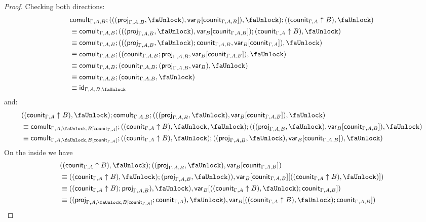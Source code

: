 \documentclass[10pt]{article}
\theoremstyle{definition}
\newcommand{\id}{\mathsf{id}}
\newcommand\proj[1]{\ensuremath{\mathsf{proj}_{#1}}}
\newcommand\qvar[1]{\ensuremath{\mathsf{var}_{#1}}}
\newcommand{\lock}{\text{\faUnlock}}
\newcommand{\counit}[1]{\mathsf{counit}_{#1}}
\newcommand{\comult}[1]{\mathsf{comult}_{#1}}
\begin{document}
\begin{proof}
Checking both directions:
\begin{align*}
&\comult{\Gamma, A, B};(((\proj{\Gamma, A, B}, \lock), \qvar{B}[\counit{\Gamma, A,B}]), \lock);((\counit{\Gamma, A} \uparrow B), \lock) \\
&\equiv \comult{\Gamma, A, B};(((\proj{\Gamma, A, B}, \lock), \qvar{B}[\counit{\Gamma, A,B}]);(\counit{\Gamma, A} \uparrow B), \lock) \\
&\equiv \comult{\Gamma, A, B};(((\proj{\Gamma, A, B}, \lock);\counit{\Gamma, A,B}, \qvar{B}[\counit{\Gamma, A}]), \lock) \\
&\equiv \comult{\Gamma, A, B};((\counit{\Gamma, A, B};\proj{\Gamma, A, B}, \qvar{B}[\counit{\Gamma, A,B}]), \lock) \\
&\equiv \comult{\Gamma, A, B};(\counit{\Gamma, A, B};(\proj{\Gamma, A, B}, \qvar{B}), \lock) \\
&\equiv \comult{\Gamma, A, B};(\counit{\Gamma, A, B}, \lock) \\
&\equiv \id_{\Gamma, A, B, \lock}
\end{align*}
and:
\begin{align*}
&((\counit{\Gamma, A} \uparrow B), \lock);\comult{\Gamma, A, B};(((\proj{\Gamma, A, B}, \lock), \qvar{B}[\counit{\Gamma, A,B}]), \lock) \\
&\equiv \comult{\Gamma, A, \lock, B[\counit{\Gamma, A}]};((\counit{\Gamma, A} \uparrow B), \lock, \lock);(((\proj{\Gamma, A, B}, \lock), \qvar{B}[\counit{\Gamma, A,B}]), \lock) \\
&\equiv \comult{\Gamma, A, \lock, B[\counit{\Gamma, A}]};((\counit{\Gamma, A} \uparrow B), \lock);((\proj{\Gamma, A, B}, \lock), \qvar{B}[\counit{\Gamma, A,B}]), \lock)
\end{align*}
On the inside we have
\begin{align*}
&((\counit{\Gamma, A} \uparrow B), \lock);((\proj{\Gamma, A, B}, \lock), \qvar{B}[\counit{\Gamma, A,B}]) \\
&\equiv ((\counit{\Gamma, A} \uparrow B), \lock);(\proj{\Gamma, A, B}, \lock)), \qvar{B}[\counit{\Gamma, A,B}][((\counit{\Gamma, A} \uparrow B), \lock)]) \\
&\equiv ((\counit{\Gamma, A} \uparrow B);\proj{\Gamma, A, B}) , \lock), \qvar{B}[((\counit{\Gamma, A} \uparrow B), \lock);\counit{\Gamma, A,B}]) \\
&\equiv ((\proj{\Gamma, A, \lock, B[\counit{\Gamma, A}]};\counit{\Gamma, A}), \lock), \qvar{B}[((\counit{\Gamma, A} \uparrow B), \lock);\counit{\Gamma, A,B}]) \\

\end{align*}
\end{proof}
\end{document}
